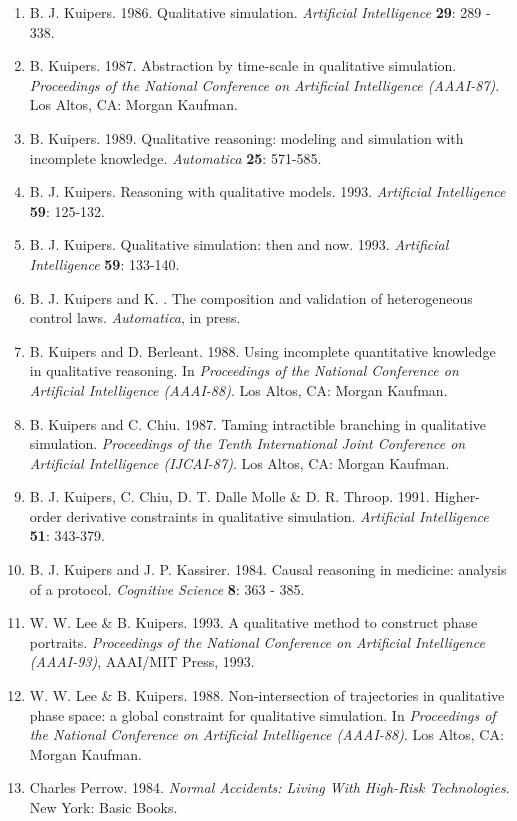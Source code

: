 \begin{enumerate}
  \item
B. J. Kuipers.  1986.  Qualitative simulation.  
{\it Artificial Intelligence} {\bf 29}: 289 - 338.

  \item
B. Kuipers.  1987.
Abstraction by time-scale in qualitative simulation.
{\it Proceedings of the National Conference on Artificial
Intelligence (AAAI-87)}.  Los Altos, CA: Morgan Kaufman.

  \item
B. Kuipers.  1989.  Qualitative reasoning:  modeling and simulation
with incomplete knowledge.  {\it Automatica} {\bf 25}: 571-585.

  \item
B. J. Kuipers.  Reasoning with qualitative models.  1993.
{\em Artificial Intelligence} {\bf 59}: 125-132.

  \item
B. J. Kuipers.  Qualitative simulation:  then and now.  1993.
{\em Artificial Intelligence} {\bf 59}: 133-140.

  \item
B. J. Kuipers and K. \Astrom.  The composition and validation of heterogeneous control laws.
{\em Automatica}, in press.

  \item
B. Kuipers and D. Berleant.  1988.  Using incomplete quantitative knowledge
in qualitative reasoning.  In {\it Proceedings of the
National Conference on Artificial Intelligence (AAAI-88)}.
Los Altos, CA:  Morgan Kaufman.

  \item
B. Kuipers and C. Chiu.  1987.
Taming intractible branching in qualitative simulation.
{\it Proceedings of the Tenth International Joint Conference
on Artificial Intelligence (IJCAI-87)}.  Los Altos, CA: Morgan Kaufman.

  \item
 B. J. Kuipers, C. Chiu, D. T. Dalle Molle \& D. R. Throop.  1991.
Higher-order derivative constraints in qualitative simulation.
{\it Artificial Intelligence} {\bf 51}:  343-379.

  \item
B. J. Kuipers and J. P. Kassirer.  1984.
Causal reasoning in medicine:  analysis of a protocol.
{\it Cognitive Science} {\bf 8}: 363 - 385.

  \item 
 W. W. Lee \& B. Kuipers.  1993.  A qualitative method to construct phase portraits.
{\it Proceedings of the National Conference on Artificial Intelligence (AAAI-93)},
AAAI/MIT Press, 1993.

  \item
W. W. Lee \& B. Kuipers.  1988.  Non-intersection of trajectories in
qualitative phase space:  a global constraint for qualitative
simulation.  In {\it Proceedings of the National Conference on
Artificial Intelligence (AAAI-88)}.  Los Altos, CA:  Morgan Kaufman.

  \item
Charles Perrow.  1984.  {\it Normal Accidents:  Living With High-Risk Technologies}.
New York:  Basic Books.

 \end{enumerate}




